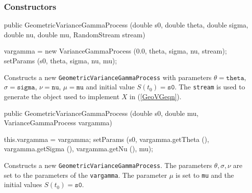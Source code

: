 \subsubsection* {Constructors}
\begin{code}

   public GeometricVarianceGammaProcess (double s0, double theta,
                                         double sigma, double nu,
                                         double mu, RandomStream stream) \begin{hide} {
        vargamma = new VarianceGammaProcess (0.0, theta, sigma, nu, stream);
        setParams (s0, theta, sigma, nu, mu);
    }\end{hide}
\end{code}
\begin{tabb}
Constructs a new \texttt{GeometricVarianceGammaProcess} with parameters
$\theta = \texttt{theta}$, $\sigma = \texttt{sigma}$, $\nu = \texttt{nu}$,
$\mu = \texttt{mu}$ and initial value $S(t_{0}) = \texttt{s0}$.
The \texttt{stream} is  used to generate the  object used to implement
$X$ in (\ref{GeoVGeqn}).
\end{tabb}
\begin{code}

   public GeometricVarianceGammaProcess (double s0, double mu,
                                         VarianceGammaProcess vargamma)
 \begin{hide} {
        this.vargamma = vargamma;
        setParams (s0, vargamma.getTheta (), vargamma.getSigma (),
                   vargamma.getNu (), mu);
    }\end{hide}
\end{code}
\begin{tabb}
Constructs a new \texttt{GeometricVarianceGammaProcess}.
The parameters $\theta, \sigma, \nu$ are set to the parameters of the
  \texttt{vargamma}. The parameter $\mu$
is set to \texttt{mu} and the initial values $S(t_{0}) = \texttt{s0}$.
\end{tabb}
